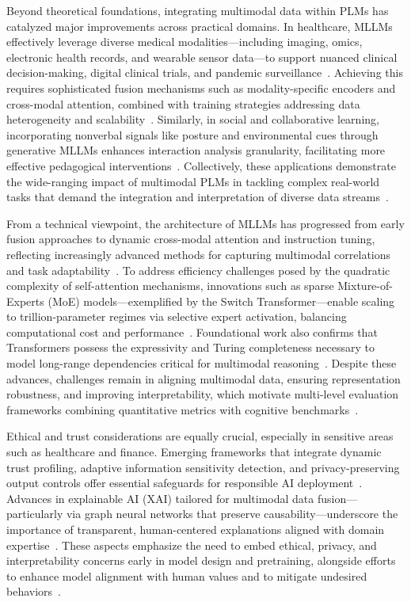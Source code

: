 \documentclass[sigconf]{acmart}
\begin{document}
Beyond theoretical foundations, integrating multimodal data within PLMs has catalyzed major improvements across practical domains. In healthcare, MLLMs effectively leverage diverse medical modalities—including imaging, omics, electronic health records, and wearable sensor data—to support nuanced clinical decision-making, digital clinical trials, and pandemic surveillance~\cite{ref21}. Achieving this requires sophisticated fusion mechanisms such as modality-specific encoders and cross-modal attention, combined with training strategies addressing data heterogeneity and scalability~\cite{ref23}. Similarly, in social and collaborative learning, incorporating nonverbal signals like posture and environmental cues through generative MLLMs enhances interaction analysis granularity, facilitating more effective pedagogical interventions~\cite{ref12}. Collectively, these applications demonstrate the wide-ranging impact of multimodal PLMs in tackling complex real-world tasks that demand the integration and interpretation of diverse data streams~\cite{ref28}.

From a technical viewpoint, the architecture of MLLMs has progressed from early fusion approaches to dynamic cross-modal attention and instruction tuning, reflecting increasingly advanced methods for capturing multimodal correlations and task adaptability~\cite{ref14}. To address efficiency challenges posed by the quadratic complexity of self-attention mechanisms, innovations such as sparse Mixture-of-Experts (MoE) models—exemplified by the Switch Transformer—enable scaling to trillion-parameter regimes via selective expert activation, balancing computational cost and performance~\cite{ref29}. Foundational work also confirms that Transformers possess the expressivity and Turing completeness necessary to model long-range dependencies critical for multimodal reasoning~\cite{ref15}. Despite these advances, challenges remain in aligning multimodal data, ensuring representation robustness, and improving interpretability, which motivate multi-level evaluation frameworks combining quantitative metrics with cognitive benchmarks~\cite{ref33}.

Ethical and trust considerations are equally crucial, especially in sensitive areas such as healthcare and finance. Emerging frameworks that integrate dynamic trust profiling, adaptive information sensitivity detection, and privacy-preserving output controls offer essential safeguards for responsible AI deployment~\cite{ref22}. Advances in explainable AI (XAI) tailored for multimodal data fusion—particularly via graph neural networks that preserve causability—underscore the importance of transparent, human-centered explanations aligned with domain expertise~\cite{ref26}. These aspects emphasize the need to embed ethical, privacy, and interpretability concerns early in model design and pretraining, alongside efforts to enhance model alignment with human values and to mitigate undesired behaviors~\cite{ref27}.
\end{document}

